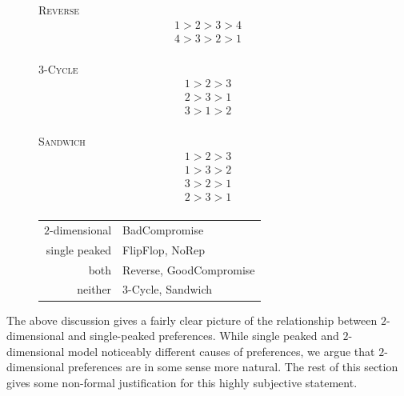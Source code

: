 \documentclass[12pt]{article}
\newcommand{\1}[1]{\mathds{1}[{#1}]}
\begin{document}
  \begin{figure}[H]
    \begin{minipage}{0.15\textwidth}
      \centering
      {\textsc{Reverse}}
      \begin{align*}
        1 > 2 > 3 > 4 \\
        4 > 3 > 2 > 1 \\
      \end{align*}
    \end{minipage}\hfill
    \begin{minipage}{0.15\textwidth}
      \centering
      {$3$-\textsc{Cycle}}
      \begin{align*}
        1 > 2 > 3 \\
        2 > 3 > 1 \\
        3 > 1 > 2 \\
      \end{align*}
    \end{minipage}\hfill
    \begin{minipage}{0.15\textwidth}
      \centering
      {\textsc{Sandwich}}
      \begin{align*}
        1 > 2 > 3 \\
        1 > 3 > 2 \\
        3 > 2 > 1 \\
        2 > 3 > 1 \\
      \end{align*}
    \end{minipage}\hfill
    \begin{minipage}{0.55\textwidth}
      \centering
      \begin{tabular}{ r | l }
        $2$-dimensional & {\sc BadCompromise} \\
        single peaked & {\sc FlipFlop}, {\sc NoRep} \\
        both & {\sc Reverse}, {\sc GoodCompromise} \\
        neither & $3$-{\sc Cycle}, {\sc Sandwich} \\
      \end{tabular}
    \end{minipage}\hfill
  \end{figure}

  The above discussion gives a fairly clear picture of the relationship between
  $2$-dimensional and single-peaked preferences.
  While single peaked and $2$-dimensional model noticeably different causes of
  preferences, we argue that $2$-dimensional preferences are in some sense more
  natural. The rest of this section gives some non-formal justification
  for this highly subjective statement.
\end{document}
